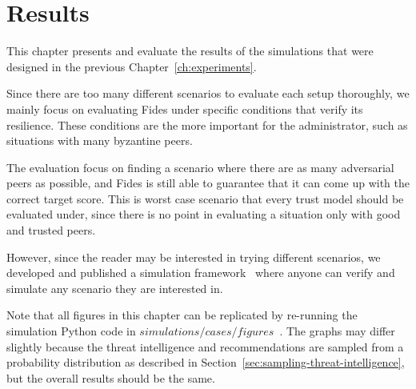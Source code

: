 \chapter{Results}
\label{ch:results}

This chapter presents and evaluate the results of the simulations that were designed in the previous Chapter~\ref{ch:experiments}. 

Since there are too many different scenarios to evaluate each setup thoroughly, we mainly focus on evaluating Fides under specific conditions that verify its resilience. These conditions are the more important for the administrator, such as situations with many byzantine peers.

The evaluation focus on finding a scenario where there are as many adversarial peers as possible, and Fides is still able to guarantee that it can come up with the correct target score. This is worst case scenario that every trust model should be evaluated under, since there is no point in evaluating a situation only with good and trusted peers.

However, since the reader may be interested in trying different scenarios, we developed and published a simulation framework~\cite{fidesGithub} where anyone can verify and simulate any scenario they are interested in.

Note that all figures in this chapter can be replicated by re-running the simulation Python code in $simulations/cases/figures$~\cite{fidesGithub}.
The graphs may differ slightly because the threat intelligence and recommendations are sampled from a probability distribution as described in Section~\ref{sec:sampling-threat-intelligence}, but the overall results should be the same.





